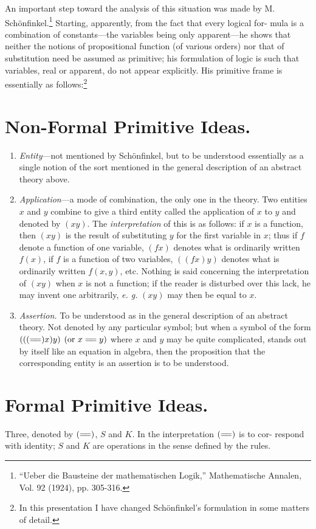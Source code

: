 \documentclass[10pt, twoside]{extarticle}
\newcommand\litem[1]{\item{\textit{#1}}}
\newcommand\longeq{=\joinrel=}
\theoremstyle{breaktheorem}
\theoremstyle{mylemma}
\theoremstyle{mydefinition}
\theoremstyle{mycorollary}
\begin{document}
An important step toward the analysis of this situation was made by
M. Schönfinkel.\footnote{``Ueber die Bausteine der mathematischen Logik,'' Mathematische Annalen, Vol. 92 (1924), pp. 305-316.} Starting, apparently, from the fact that every logical for-
mula is a combination of constants---the variables being only apparent---he
shows that neither the notions of propositional function (of various orders)
nor that of substitution need be assumed as primitive; his formulation of
logic is such that variables, real or apparent, do not appear explicitly. His primitive frame is essentially as follows:\footnote{In this presentation I have changed Schönfinkel's formulation in some matters of detail.}

\section{Non-Formal Primitive Ideas.}
\begin{enumerate}[label=\arabic*.,font=\itshape,wide]
\litem{Entity}---not mentioned by Schönfinkel, but to be understood
essentially as a single notion of the sort mentioned in the general description
of an abstract theory above.

\litem{Application}---a mode of combination, the only one in the theory.
Two entities \(x\) and \(y\) combine to give a third entity called the application of
\(x\) to \(y\) and denoted by \((xy)\). The \textit{interpretation} of this is as follows: if \(x\) is a function,
then \((xy)\) is the result of substituting \(y\) for the first variable in \(x\);
thus if \(f\) denote a function of one variable, \((fx)\) denotes what is ordinarily
written \(f(x)\), if \(f\) is a function of two variables, \(((fx) y)\) denotes what is
ordinarily written \(f(x, y)\), etc. Nothing is said concerning the interpretation
of \((xy)\) when \(x\) is not a function; if the reader is disturbed over this lack,
he may invent one arbitrarily, \textit{e. g.} \((xy)\) may then be equal to \(x\).

\litem{Assertion.} To be understood as in the general description of an
abstract theory. Not denoted by any particular symbol; but when a symbol
of the form \((((\longeq)x)y)\) \((\text{or } x \longeq y)\) where \(x\) and \(y\) may be quite complicated,
stands out by itself like an equation in algebra, then the proposition that the
corresponding entity is an assertion is to be understood.
\end{enumerate}

\section{Formal Primitive Ideas.}
Three, denoted by \((\longeq)\), \(S\) and \(K\). In the interpretation \((\longeq)\) is to cor-
respond with identity; \(S\) and \(K\) are operations in the sense defined by the
rules.
\end{document}
